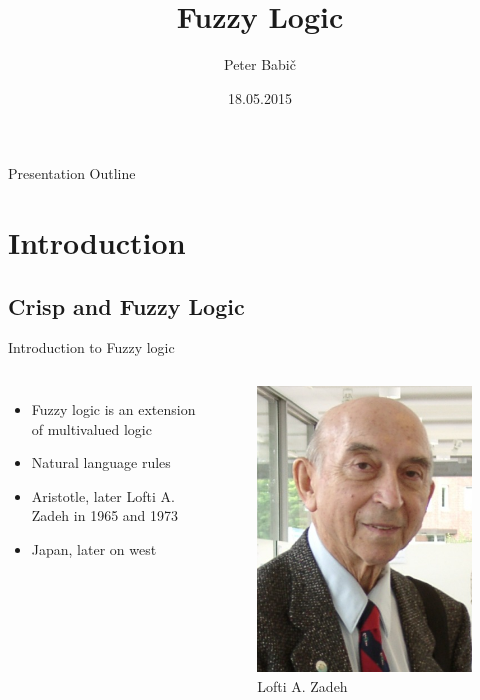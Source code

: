 \documentclass[hyperref={unicode}]{beamer}
\title[Fuzzy logic]{Fuzzy Logic}
\author{Peter Babič}
\institute{Technical University of Košice, Slovakia}
\date{18.05.2015}
\begin{document}
\boldmath


\begin{frame}
	\titlepage
\end{frame}

\begin{frame}{Presentation Outline}
  \tableofcontents
\end{frame}



\section{Introduction}


\subsection{Crisp and Fuzzy Logic}

\begin{frame}{Introduction to Fuzzy logic}
	\begin{columns}
		\begin{itemize}
		\item Fuzzy logic is an extension of multivalued logic
		\item Natural language rules
		\item Aristotle, later Lofti A. Zadeh in 1965 and 1973
		\item Japan, later on west
		\end{itemize}

		\begin{figure}[b]
		\includegraphics{lofti}
		\caption{Lofti A. Zadeh}
		\end{figure}
	\end{columns}
\end{frame}
\end{document}
